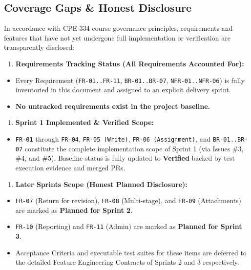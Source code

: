 \documentclass[11pt,a4paper]{article}
\begin{document}
\subsection{Coverage Gaps \& Honest Disclosure}

In accordance with CPE 334 course governance principles, requirements and features that have not yet undergone full implementation or verification are transparently disclosed:\\

\begin{enumerate}[leftmargin=*,itemsep=2pt,topsep=2pt]
  \item \textbf{Requirements Tracking Status (All Requirements Accounted For):}
\end{enumerate}
\begin{itemize}[leftmargin=*,itemsep=2pt,topsep=2pt]
  \item Every Requirement (\texttt{FR-01..FR-11}, \texttt{BR-01..BR-07}, \texttt{NFR-01..NFR-06}) is fully inventoried in this document and assigned to an explicit delivery sprint.
  \item \textbf{No untracked requirements exist in the project baseline.}
\end{itemize}
\begin{enumerate}[leftmargin=*,itemsep=2pt,topsep=2pt]
  \item \textbf{Sprint 1 Implemented \& Verified Scope:}
\end{enumerate}
\begin{itemize}[leftmargin=*,itemsep=2pt,topsep=2pt]
  \item \texttt{FR-01} through \texttt{FR-04}, \texttt{FR-05 (Write)}, \texttt{FR-06 (Assignment)}, and \texttt{BR-01..BR-07} constitute the complete implementation scope of Sprint 1 (via Issues \#3, \#4, and \#5). Baseline status is fully updated to \textbf{Verified} backed by test execution evidence and merged PRs.
\end{itemize}
\begin{enumerate}[leftmargin=*,itemsep=2pt,topsep=2pt]
  \item \textbf{Later Sprints Scope (Honest Planned Disclosure):}
\end{enumerate}
\begin{itemize}[leftmargin=*,itemsep=2pt,topsep=2pt]
  \item \texttt{FR-07} (Return for revision), \texttt{FR-08} (Multi-stage), and \texttt{FR-09} (Attachments) are marked as \textbf{Planned for Sprint 2}.
  \item \texttt{FR-10} (Reporting) and \texttt{FR-11} (Admin) are marked as \textbf{Planned for Sprint 3}.
  \item Acceptance Criteria and executable test suites for these items are deferred to the detailed Feature Engineering Contracts of Sprints 2 and 3 respectively.
\end{itemize}
\end{document}
